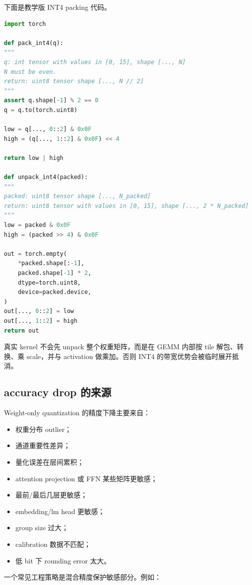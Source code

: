 下面是教学版 INT4 packing 代码。

\begin{lstlisting}[language=Python,caption={教学版 INT4 packing 与 unpacking},label={lst:int4-pack-unpack}]
import torch

def pack_int4(q):
"""
q: int tensor with values in [0, 15], shape [..., N]
N must be even.
return: uint8 tensor shape [..., N // 2]
"""
assert q.shape[-1] % 2 == 0
q = q.to(torch.uint8)

low = q[..., 0::2] & 0x0F
high = (q[..., 1::2] & 0x0F) << 4

return low | high

def unpack_int4(packed):
"""
packed: uint8 tensor shape [..., N_packed]
return: uint8 tensor with values in [0, 15], shape [..., 2 * N_packed]
"""
low = packed & 0x0F
high = (packed >> 4) & 0x0F

out = torch.empty(
    *packed.shape[:-1],
    packed.shape[-1] * 2,
    dtype=torch.uint8,
    device=packed.device,
)
out[..., 0::2] = low
out[..., 1::2] = high
return out

\end{lstlisting}

真实 kernel 不会先 unpack 整个权重矩阵，而是在 GEMM 内部按 tile 解包、转换、乘 scale，并与 activation 做乘加。否则 INT4 的带宽优势会被临时展开抵消。

\subsection{accuracy drop 的来源}
\label{subsec:weight-only-accuracy-drop-sources}

Weight-only quantization 的精度下降主要来自：

\begin{itemize}
\item 权重分布 outlier；
\item 通道重要性差异；
\item 量化误差在层间累积；
\item attention projection 或 FFN 某些矩阵更敏感；
\item 最前/最后几层更敏感；
\item embedding/lm head 更敏感；
\item group size 过大；
\item calibration 数据不匹配；
\item 低 bit 下 rounding error 太大。
\end{itemize}

一个常见工程策略是混合精度保护敏感部分。例如：


